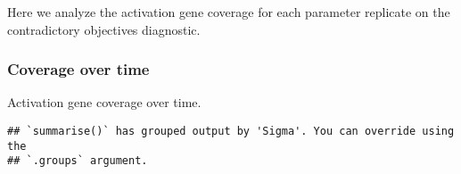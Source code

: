 \documentclass[]{book}
\newenvironment{Shaded}{\begin{snugshade}}{\end{snugshade}}
\newcommand{\DataTypeTok}[1]{\textcolor[rgb]{0.13,0.29,0.53}{#1}}
\newcommand{\KeywordTok}[1]{\textcolor[rgb]{0.13,0.29,0.53}{\textbf{#1}}}
\newcommand{\NormalTok}[1]{#1}
\newcommand{\OperatorTok}[1]{\textcolor[rgb]{0.81,0.36,0.00}{\textbf{#1}}}
\newcommand{\StringTok}[1]{\textcolor[rgb]{0.31,0.60,0.02}{#1}}
\begin{document}
Here we analyze the activation gene coverage for each parameter replicate on the contradictory objectives diagnostic.

\hypertarget{coverage-over-time-15}{%
\subsubsection{Coverage over time}\label{coverage-over-time-15}}

Activation gene coverage over time.

\begin{Shaded}
\end{Shaded}

\begin{verbatim}
## `summarise()` has grouped output by 'Sigma'. You can override using the
## `.groups` argument.
\end{verbatim}
\end{document}
